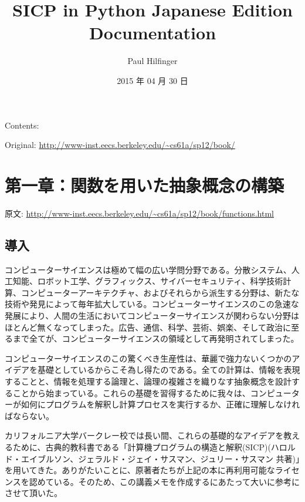 \documentclass[letterpaper,10pt,dvipdfmx]{sphinxmanual}
\title{SICP in Python Japanese Edition Documentation}
\date{2015 年 04 月 30 日}
\author{Paul Hilfinger}
\begin{document}
\maketitle
\tableofcontents
{}\label{index::doc}


Contents:

Original: \href{http://www-inst.eecs.berkeley.edu/~cs61a/sp12/book/}{http://www-inst.eecs.berkeley.edu/\textasciitilde{}cs61a/sp12/book/}


\chapter{第一章：関数を用いた抽象概念の構築}
\label{functions::doc}\label{functions:welcome-to-sicp-in-python-japanese-edition-s-documentation}\label{functions:id1}
原文: \href{http://www-inst.eecs.berkeley.edu/~cs61a/sp12/book/functions.html}{http://www-inst.eecs.berkeley.edu/\textasciitilde{}cs61a/sp12/book/functions.html}


\section{導入}
\label{functions:id2}
コンピューターサイエンスは極めて幅の広い学問分野である。分散システム、人工知能、ロボット工学、グラフィックス、サイバーセキュリティ、科学技術計算、コンピューターアーキテクチャ、およびそれらから派生する分野は、新たな技術や発見によって毎年拡大している。コンピューターサイエンスのこの急速な発展により、人間の生活においてコンピューターサイエンスが関わらない分野はほとんど無くなってしまった。広告、通信、科学、芸術、娯楽、そして政治に至るまで全てが、コンピューターサイエンスの領域として再発明されてしまった。

コンピューターサイエンスのこの驚くべき生産性は、華麗で強力ないくつかのアイデアを基礎としているからこそ為し得たのである。全ての計算は、情報を表現することと、情報を処理する論理と、論理の複雑さを織りなす抽象概念を設計することから始まっている。これらの基礎を習得するために我々は、コンピューターが如何にプログラムを解釈し計算プロセスを実行するか、正確に理解しなければならない。

カリフォルニア大学バークレー校では長い間、これらの基礎的なアイデアを教えるために、古典的教科書である「計算機プログラムの構造と解釈(SICP)(ハロルド・エイブルソン、ジェラルド・ジェイ・サスマン、ジュリー・サスマン 共著)」を用いてきた。ありがたいことに、原著者たちが上記の本に再利用可能なライセンスを認めている。そのため、この講義メモを作成するにあたって大いに参考にさせて頂いた。
\end{document}
